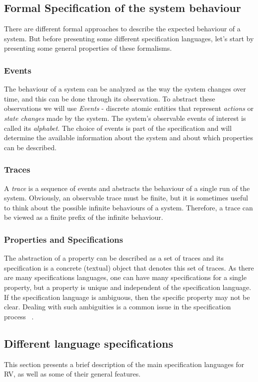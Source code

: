  
\subsection{Formal Specification of the system behaviour}
There are different formal approaches to describe the expected behaviour of a system. But before presenting some different specification languages, let's start by presenting some general properties of these formalisms. 

\subsubsection{Events}
The behaviour of a system can be analyzed as the way the system changes over time, and this can be done through its observation. To abstract these observations we will use \textit{Events} - discrete atomic entities that represent \textit{actions} or \textit{state changes} made by the system. 
The system's observable events of interest is called its \textit{alphabet}. The choice of events is part of the specification and will determine the available information about the system and about which properties can be described.

\subsubsection{Traces}
A \textit{trace} is a sequence of events and abstracts the behaviour of a single run of the system. Obviously, an observable trace must be finite, but it is sometimes useful to think about the possible infinite behaviours of a system. Therefore, a trace can be viewed as a finite prefix of the infinite behaviour.

\subsubsection{Properties and Specifications}
The abstraction of a property can be described as a set of traces and its specification is a concrete (textual) object that denotes this set of traces.
As there are many specifications languages, one can have many specifications for a single property, but a property is unique and independent of the specification language. If the specification language is ambiguous, then the specific property may not be clear. Dealing with such ambiguities is a common issue in the specification process ~\cite{rv2}.


\subsection{Different language specifications}
This section presents a brief description of the main specification languages for RV, as well as some of their general features.

